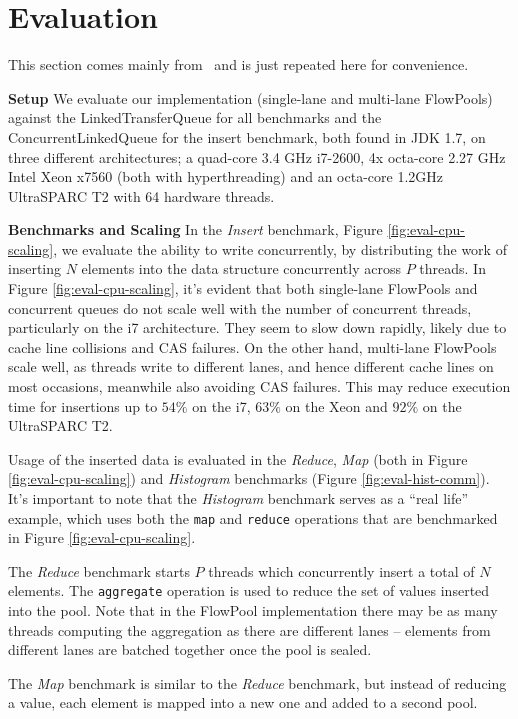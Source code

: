 \documentclass[runningheads,a4paper,fleqn]{llncs}
\begin{document}
\section{Evaluation}
\label{sec:evaluation}
This section comes mainly from~\cite{FP12} and is just repeated here
for convenience.

\textbf{Setup} We evaluate our implementation (single-lane and
multi-lane FlowPools) against the LinkedTransferQueue
\cite{SchererLS09} for all benchmarks and the ConcurrentLinkedQueue
\cite{Michael96} for the insert benchmark, both found in JDK 1.7, on
three different architectures; a quad-core 3.4 GHz i7-2600, 4x
octa-core 2.27 GHz Intel Xeon x7560 (both with hyperthreading) and an
octa-core  1.2GHz UltraSPARC T2 with 64 hardware threads. 

\textbf{Benchmarks and Scaling} In the \emph{Insert} benchmark, Figure
\ref{fig:eval-cpu-scaling}, we evaluate the ability to write
concurrently, by distributing the work of inserting $N$ elements into
the data structure concurrently across $P$ threads. 
In Figure \ref{fig:eval-cpu-scaling}, it's evident that both
single-lane FlowPools and concurrent queues do 
not scale well with the number of concurrent threads, particularly
on the i7 architecture. They seem to slow down rapidly, likely due to cache
line collisions and CAS failures.
On the other hand, multi-lane FlowPools scale well, as threads
write to different lanes, and hence different cache lines on
most occasions, meanwhile also avoiding CAS failures. This may reduce execution
time for insertions up to $54\%$ on the i7, $63\%$ on the
Xeon and $92\%$ on the UltraSPARC T2.

Usage of the inserted data is evaluated in the \emph{Reduce}, \emph{Map} (both
in Figure \ref{fig:eval-cpu-scaling}) and \emph{Histogram} benchmarks (Figure
\ref{fig:eval-hist-comm}). It's important to note that the \emph{Histogram} benchmark
serves as a ``real life'' example, which uses both the \verb=map= and \verb=reduce=
operations that are benchmarked in Figure \ref{fig:eval-cpu-scaling}.

The \textit{Reduce} benchmark starts $P$ threads which concurrently
insert a total of $N$ elements. The \verb=aggregate= operation is used
to reduce the set of values inserted into the pool. Note that in the
FlowPool implementation there may be as many threads computing the
aggregation as there are different lanes -- elements from different
lanes are batched together once the pool is sealed.

The \textit{Map} benchmark is similar to the \textit{Reduce}
benchmark, but instead of reducing a value, each element is mapped
into a new one and added to a second pool.
\end{document}
